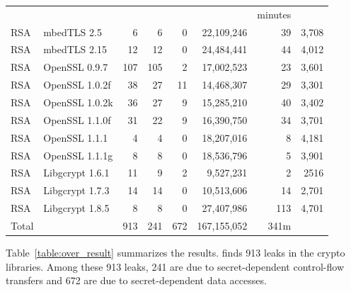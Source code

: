 \begin{table}[]
\begin{tabular}{llrrrrrr}
                       &                          &                   &                   &                &             & minutes         \\\cline{7-7}
    RSA                & mbedTLS 2.5              & 6                 & 6                 & 0              & 22,109,246  & 39      & 3,708 \\
    RSA                & mbedTLS 2.15             & 12                & 12                & 0              & 24,484,441  & 44      & 4,012 \\
    RSA                & OpenSSL 0.9.7            & 107               & 105               & 2              & 17,002,523  & 23      & 3,601 \\
    RSA                & OpenSSL 1.0.2f           & 38                & 27                & 11             & 14,468,307  & 29      & 3,301 \\
    RSA                & OpenSSL 1.0.2k           & 36                & 27                & 9              & 15,285,210  & 40      & 3,402 \\
    RSA                & OpenSSL 1.1.0f           & 31                & 22                & 9              & 16,390,750  & 34      & 3,701 \\
    RSA                & OpenSSL 1.1.1            & 4                 & 4                 & 0              & 18,207,016  & 8       & 4,181 \\
    RSA                & OpenSSL 1.1.1g           & 8                 & 8                 & 0              & 18,536,796  & 5       & 3,901 \\
    RSA                & Libgcrypt 1.6.1          & 11                & 9                 & 2              & 9,527,231   & 2       & 2516  \\
    RSA                & Libgcrypt 1.7.3          & 14                & 14                & 0              & 10,513,606  & 14      & 2,701 \\
    RSA                & Libgcrypt 1.8.5          & 8                 & 8                 & 0              & 27,407,986  & 113     & 4,701 \\

    Total              &                          & 913               & 241               & 672            & 167,155,052 & 341m            \\\hline
  \end{tabular}
\end{table}
Table~\ref{table:over_result} summarizes the results.
\tool{} finds 913 leaks in the crypto libraries.
Among these 913 leaks, 241 are due to secret-dependent
control-flow transfers and 672 are due to secret-dependent data accesses.

